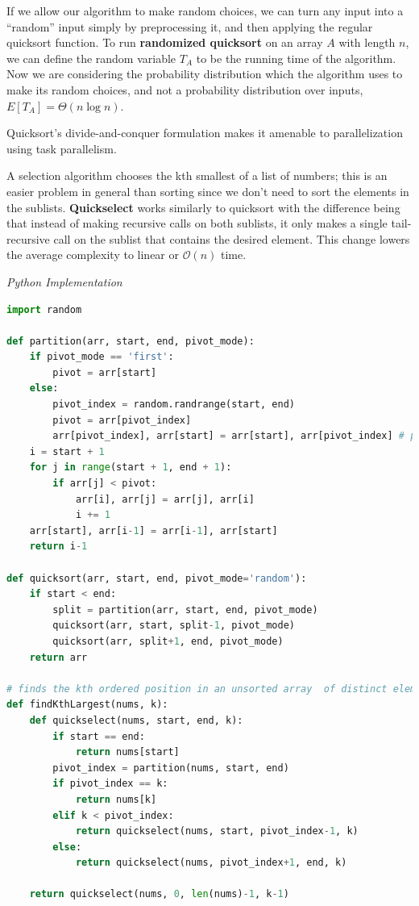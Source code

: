 \documentclass{article}
\newcommand{\bigO}{\mathcal{O}}
\begin{document}
    If we allow our algorithm to make random choices, we can turn any input into a ``random” input simply by preprocessing it, and then applying the regular quicksort function. To run \textbf{randomized quicksort} on an array $A$ with length $n$, we can define the random variable $T_A$ to be the running time of the algorithm. Now we are considering the probability distribution which the algorithm uses to make its random choices, and not a probability distribution over inputs, $E[T_A] = \Theta(n \log{n})$.
    
    Quicksort's divide-and-conquer formulation makes it amenable to parallelization using task parallelism. 
    
    A selection algorithm chooses the kth smallest of a list of numbers; this is an easier problem in general than sorting since we don't need to sort the elements in the sublists.  \textbf{Quickselect} works similarly to quicksort with the difference being that instead of making recursive calls on both sublists, it only makes a single tail-recursive call on the sublist that contains the desired element. This change lowers the average complexity to linear or $\bigO(n)$ time.
    
\vspace{8pt} \emph{Python Implementation}
\begin{lstlisting}[language=Python]
import random

def partition(arr, start, end, pivot_mode):
	if pivot_mode == 'first':
		pivot = arr[start]
	else:
		pivot_index = random.randrange(start, end)
		pivot = arr[pivot_index]
		arr[pivot_index], arr[start] = arr[start], arr[pivot_index] # place the pivot at the start
	i = start + 1
	for j in range(start + 1, end + 1):
		if arr[j] < pivot:
			arr[i], arr[j] = arr[j], arr[i]
			i += 1
	arr[start], arr[i-1] = arr[i-1], arr[start]
	return i-1

def quicksort(arr, start, end, pivot_mode='random'):
    if start < end:
    	split = partition(arr, start, end, pivot_mode)
    	quicksort(arr, start, split-1, pivot_mode)
    	quicksort(arr, split+1, end, pivot_mode)
    return arr
	
# finds the kth ordered position in an unsorted array  of distinct elements 
def findKthLargest(nums, k):
    def quickselect(nums, start, end, k):
        if start == end:
            return nums[start]
        pivot_index = partition(nums, start, end) 
        if pivot_index == k:
            return nums[k]
        elif k < pivot_index:
            return quickselect(nums, start, pivot_index-1, k)
        else: 
            return quickselect(nums, pivot_index+1, end, k)
    
    return quickselect(nums, 0, len(nums)-1, k-1)
\end{lstlisting}
    
\end{document}
